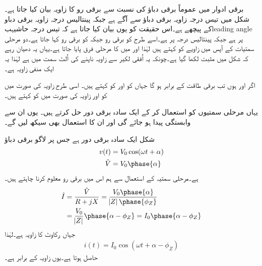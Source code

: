 برقی ادوار میں عموماً برقی دباؤ  کی نسبت سے  برقی رو   کا زاویہ بیان کیا جاتا ہے۔شکل    میں  تیس درجہ زاویہ برقی دباؤ سے آگے ہے جبکہ    پینتالیس درجہ زاویہ برقی دباو کے  پیچھے  ہے۔اس حقیقت کو یوں بیان کیا جاتا ہے کہ  تیس درجہ  حاشیہب{leading angle} پر  ہے جبکہ   پینتالیس درجہ   پر ہے۔اسے طرح  کو  برقی رو جبکہ  کو  برقی رو کہا جاتا ہے۔دو مرحلی سمتیات کے آپس میں زاویے کو  کہتے ہیں لہٰذا  اور  میں  کا مرحلی فرق پایا جاتا ہے۔یہاں یہ دھیان رہے کہ شکل میں   مثبت لکھا گیا ہے۔چونکہ یہ اُفقی لکیر سے زاویہ ناپنے کی اُلٹ سمت میں ہے لہٰذا یہ ایک منفی زاویہ ہے۔

اگر  اور  ہوں تب برقی طاقت  کے برابر ہو گا جہاں  کو   اور  کو  کہتے ہیں۔ اسی طرح  زاویہ کی صورت میں  کو  اور  زاویہ کی صورت میں  کو  کہتے ہیں۔

یہاں مرحلی سمتیوں کو استعمال کر کے ایک سادہ برقی دور حل کرتے ہیں۔ یوں ان سے وابستگی پیدا ہو جائے گی اور ان کا استعمال بھی سیکھ لیں گے۔

شکل    ایک سادہ   برقی دور ہے جس پر لاگو برقی دباؤ
\begin{gather}
\begin{aligned}
v(t)&=V_0 \cos (\omega t +\alpha)\\
\hat{V}&=V_0 \phase{\alpha}
\end{aligned}
\end{gather}
ہے۔مرحلی سمتیہ کے استعمال سے ہم اس میں برقی رو  معلوم کرنا چاہتے ہیں۔
\begin{gather}
\begin{aligned}
\hat{I}&=\frac{\hat{V}}{R+j X}=\frac{V_0 \phase{\alpha}}{\abs{Z} \phase {\phi_Z}}\\
&=\frac{V_0}{\abs{Z}} \phase{\alpha-\phi_Z}=I_0 \phase{\alpha-\phi_Z}
\end{aligned}
\end{gather}
جہاں  رکاوٹ کا زاویہ  ہے۔لہٰذا
\begin{align}\label{مساوات_بنیادی_حقائق_دوری_سمتیہ_سے_مزاحمت_امالہ_دور_حل}
i(t)=I_0 \cos (\omega t +\alpha-\phi_Z)
\end{align}
حاصل ہوتا ہے۔یوں  زاویہ  کے برابر ہے۔
